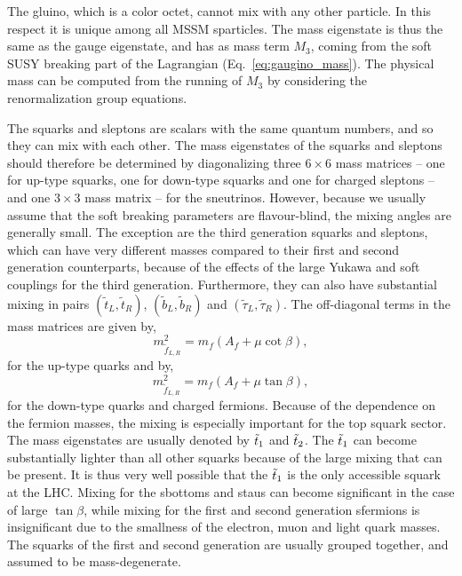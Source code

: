 The gluino, which is a color octet, cannot mix with any other particle. In this respect it is unique
among all MSSM sparticles. The mass eigenstate is thus the same as the gauge eigenstate, and has as
mass term $M_3$, coming from the soft SUSY breaking part of the Lagrangian
(Eq.~\ref{eq:gaugino_mass}). The physical mass can be computed from the running of $M_3$ by
considering the renormalization group equations. 

The squarks and sleptons are scalars with the same quantum numbers, and so they can mix with each
other. The mass eigenstates of the squarks and sleptons should therefore be determined by
diagonalizing three $6\times6$ mass matrices -- one for up-type squarks, one for down-type squarks
and one for charged sleptons -- and one $3\times3$ mass matrix -- for the sneutrinos. 
However, because we usually assume that the soft breaking parameters are flavour-blind,
the mixing angles are generally small. The exception are the third generation squarks and sleptons,
which can have very different masses compared to their first and second generation counterparts,
because of the effects of the large Yukawa and soft couplings for the third 
generation. Furthermore, they can also have substantial mixing in pairs
$(\widetilde{t}_L,\widetilde{t}_R)$, $(\widetilde{b}_L,\widetilde{b}_R)$ and
$(\widetilde{\tau}_L,\widetilde{\tau}_R)$. 
The off-diagonal terms in the mass matrices are given by,
\begin{equation}
  m^2_{\widetilde{f}_{L,R}} = m_f \left( A_f + \mu \cot\beta \right),
\end{equation}
for the up-type quarks and by,
\begin{equation}
  m^2_{\widetilde{f}_{L,R}} = m_f \left( A_f + \mu \tan\beta \right),
\end{equation}
for the down-type quarks and charged fermions.
Because of the dependence on the fermion masses, the mixing is especially important for
the top squark sector. The mass eigenstates are usually denoted by $\tilde{t}_1$ and $\tilde{t}_2$.  
The $\tilde{t}_1$ can become substantially lighter than all other squarks because of the large mixing
that can be present. It is thus very well possible that the $\tilde{t}_1$ is the only accessible
squark at the LHC. 
Mixing for the sbottoms and staus can become significant in the case of large $\tan\beta$, while
mixing for the first and second generation sfermions is insignificant due to the smallness of the
electron, muon and light quark masses. The squarks of the first and second generation are usually
grouped together, and assumed to be mass-degenerate. 

